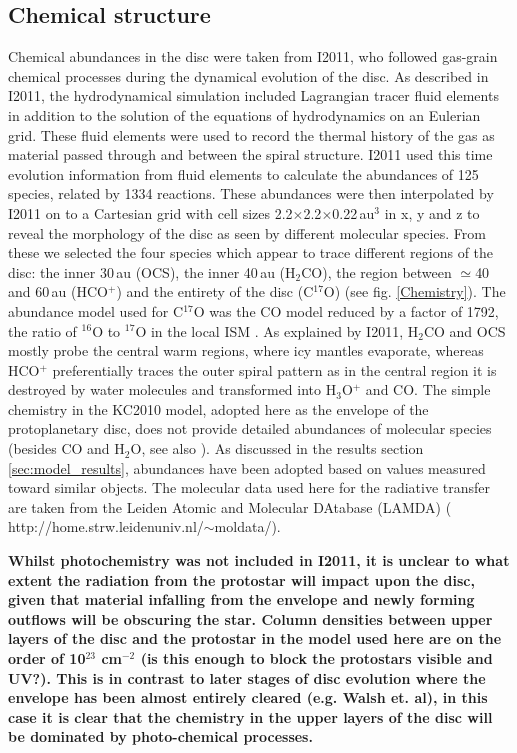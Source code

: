 \documentclass[useAMS,usenatbib]{mn2e}
\begin{document}
\subsection{Chemical structure} \label{subsec:chemical_structure}
Chemical abundances in the disc were taken from I2011, who followed gas-grain chemical processes during the dynamical evolution of the disc. As described in I2011, the hydrodynamical simulation included Lagrangian tracer fluid elements in addition to the solution of the equations of hydrodynamics on an Eulerian grid.  These fluid elements were used to record the thermal history of the gas as material passed through and between the spiral structure. I2011 used this time evolution information from fluid elements to calculate the abundances of 125 species, related by 1334 reactions.  These abundances were then interpolated by I2011 on to a Cartesian grid with cell sizes 2.2$\times$2.2$\times$0.22$\,$au$^3$ in x, y and z to reveal the morphology of the disc as seen by different molecular species. From these we selected the four species which appear to trace different regions of the disc: the inner 30\,au (OCS), the inner 40\,au (H$_2$CO),  the region between $\simeq$40 and 60\,au (HCO$^+$) and the entirety of the disc (C$^{17}$O) (see fig. \ref{Chemistry}). The abundance model used for C$^{17}$O was the CO model reduced by a factor of 1792, the ratio of $^{16}$O to $^{17}$O in the local ISM \citep{Wilson1994}. As explained by I2011,  H$_2$CO and OCS mostly probe the central warm regions, where icy mantles evaporate, whereas HCO$^+$ preferentially traces the outer spiral pattern as in the central region it is destroyed by water molecules and transformed into H$_3$O$^+$ and CO. The simple chemistry in the KC2010 model, adopted here as the envelope of the protoplanetary disc, does not provide detailed abundances of molecular species (besides CO and H$_2$O, see also \citealt{Caselli2012}). As discussed in the results section \ref{sec:model_results}, abundances have been adopted based on values measured toward similar objects. The molecular data used here for the radiative transfer are taken from the Leiden Atomic and Molecular DAtabase (LAMDA) (\citealt{Schoier2005} http://home.strw.leidenuniv.nl/$\sim$moldata/). \smallskip

{\bf Whilst photochemistry was not included in I2011, it is unclear to what extent the radiation from the protostar will impact upon the disc, given that material infalling from the envelope and newly forming outflows will be obscuring the star. Column densities between upper layers of the disc and the protostar in the model used here are on the order of 10$^{23}$ cm$^{-2}$ (is this enough to block the protostars visible and UV?). This is in contrast to later stages of disc evolution where the envelope has been almost entirely cleared (e.g. Walsh et. al), in this case it is clear that the chemistry in the upper layers of the disc will be dominated by photo-chemical processes.}
\end{document}
